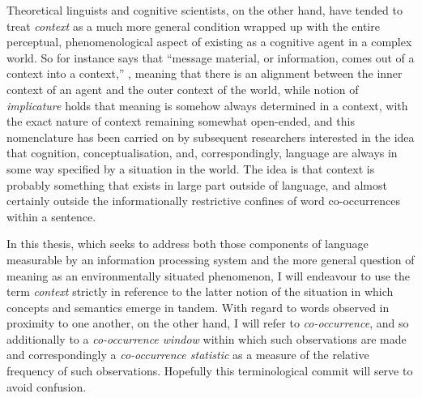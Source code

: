 Theoretical linguists and cognitive scientists, on the other hand, have tended to treat \emph{context} as a much more general condition wrapped up with the entire perceptual, phenomenological aspect of existing as a cognitive agent in a complex world.  So for instance \citeauthor{Bateson1972} says that ``message material, or information, comes out of a context into a context,'' \cite[][p. 404]{Bateson1972}, meaning that there is an alignment between the inner context of an agent and the outer context of the world, while  notion of \emph{implicature} holds that meaning is somehow always determined in a context, with the exact nature of context remaining somewhat open-ended, and this nomenclature has been carried on by subsequent researchers interested in the idea that cognition, conceptualisation, and, correspondingly, language are always in some way specified by a situation in the world.  The idea is that context is probably something that exists in large part outside of language, and almost certainly outside the informationally restrictive confines of word co-occurrences within a sentence.

In this thesis, which seeks to address both those components of language measurable by an information processing system and the more general question of meaning as an environmentally situated phenomenon, I will endeavour to use the term \emph{context} strictly in reference to the latter notion of the situation in which concepts and semantics emerge in tandem.  With regard to words observed in proximity to one another, on the other hand, I will refer to \emph{co-occurrence}, and so additionally to a \emph{co-occurrence window} within which such observations are made and correspondingly a \emph{co-occurrence statistic} as a measure of the relative frequency of such observations.  Hopefully this terminological commit will serve to avoid confusion.

